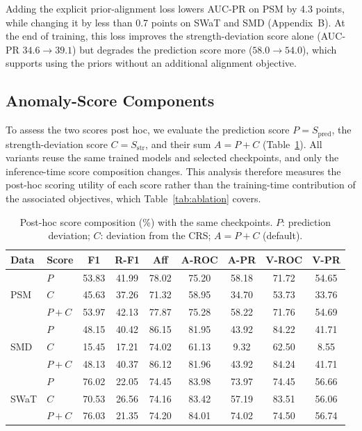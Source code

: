 \documentclass[letterpaper]{article}
\begin{document}
Adding the explicit prior-alignment loss lowers AUC-PR on PSM by 4.3 points, while changing it by less than 0.7 points on SWaT and SMD (Appendix~B). At the end of training, this loss improves the strength-deviation score alone (AUC-PR $34.6\rightarrow39.1$) but degrades the prediction score more ($58.0\rightarrow54.0$), which supports using the priors without an additional alignment objective.

\subsection{Anomaly-Score Components}
\label{sec:components}

To assess the two scores post hoc, we evaluate the prediction score $P=S_{\mathrm{pred}}$, the strength-deviation score $C=S_{\mathrm{str}}$, and their sum $A=P+C$ (Table~\ref{tab:components}). All variants reuse the same trained models and selected checkpoints, and only the inference-time score composition changes. This analysis therefore measures the post-hoc scoring utility of each score rather than the training-time contribution of the associated objectives, which Table~\ref{tab:ablation} covers.

\begin{table}[t]
\centering
\caption{Post-hoc score composition (\%) with the same checkpoints. $P$: prediction deviation; $C$: deviation from the CRS; $A=P+C$ (default).}
\label{tab:components}
\small
\setlength{\tabcolsep}{2.6pt}
\begin{tabular}{llccccccc}
\toprule
Data & Score & F1 & R-F1 & Aff & A-ROC & A-PR & V-ROC & V-PR \\
\midrule
\multirow{3}{*}{PSM}  & $P$   & 53.83 & 41.99 & 78.02 & 75.20 & 58.18 & 71.72 & 54.65 \\
                      & $C$   & 45.63 & 37.26 & 71.32 & 58.95 & 34.70 & 53.73 & 33.76 \\
                      & $P{+}C$ & 53.97 & 42.13 & 77.87 & 75.28 & 58.22 & 71.76 & 54.69 \\
\midrule
\multirow{3}{*}{SMD}  & $P$   & 48.15 & 40.42 & 86.15 & 81.95 & 43.92 & 84.22 & 41.71 \\
                      & $C$   & 15.45 & 17.21 & 74.02 & 61.13 &  9.32 & 62.50 &  8.55 \\
                      & $P{+}C$ & 48.13 & 40.37 & 86.12 & 81.96 & 43.92 & 84.24 & 41.71 \\
\midrule
\multirow{3}{*}{SWaT} & $P$   & 76.02 & 22.05 & 74.45 & 83.98 & 73.97 & 74.45 & 56.66 \\
                      & $C$   & 70.53 & 26.56 & 74.16 & 83.42 & 57.19 & 83.51 & 56.06 \\
                      & $P{+}C$ & 76.03 & 21.35 & 74.20 & 84.01 & 74.02 & 74.50 & 56.74 \\
\bottomrule
\end{tabular}
\end{table}
\end{document}
